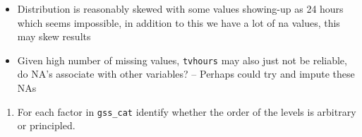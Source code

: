 \documentclass[]{book}
\newenvironment{Shaded}{\begin{snugshade}}{\end{snugshade}}
\newcommand{\KeywordTok}[1]{\textcolor[rgb]{0.13,0.29,0.53}{\textbf{#1}}}
\newcommand{\NormalTok}[1]{#1}
\newcommand{\OperatorTok}[1]{\textcolor[rgb]{0.81,0.36,0.00}{\textbf{#1}}}
\newcommand{\StringTok}[1]{\textcolor[rgb]{0.31,0.60,0.02}{#1}}
\providecommand{\tightlist}{%
  \setlength{\itemsep}{0pt}\setlength{\parskip}{0pt}}
\theoremstyle{definition}
\theoremstyle{definition}
\theoremstyle{definition}
\theoremstyle{remark}
\begin{document}
\begin{itemize}
\tightlist
\item
  Distribution is reasonably skewed with some values showing-up as 24
  hours which seems impossible, in addition to this we have a lot of na
  values, this may skew results
\item
  Given high number of missing values, \texttt{tvhours} may also just
  not be reliable, do NA's associate with other variables? -- Perhaps
  could try and impute these NAs
\end{itemize}

\begin{enumerate}
\def\labelenumi{\arabic{enumi}.}
\item
  For each factor in \texttt{gss\_cat} identify whether the order of the
  levels is arbitrary or principled.

\begin{Shaded}
\end{Shaded}


\end{enumerate}
\end{document}
